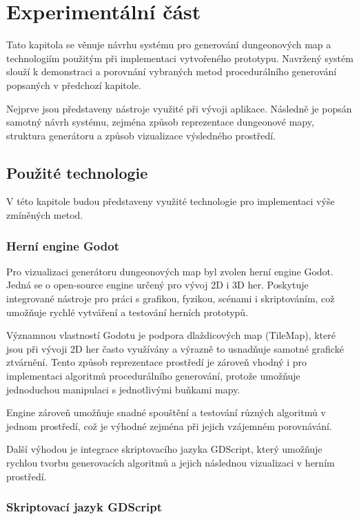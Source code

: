 \documentclass[
  program=itk,
  biblatex,
  figures=false,
  glossaries,
  index
]{kidiplom}
\begin{document}
\section{Experimentální část}

Tato kapitola se věnuje návrhu systému pro generování dungeonových map a technologiím použitým při implementaci vytvořeného prototypu. Navržený systém slouží k demonstraci a porovnání vybraných metod procedurálního generování popsaných v předchozí kapitole.

Nejprve jsou představeny nástroje využité při vývoji aplikace. Následně je popsán samotný návrh systému, zejména způsob reprezentace dungeonové mapy, struktura generátoru a způsob vizualizace výsledného prostředí.

\subsection{Použité technologie}
V této kapitole budou představeny využité technologie pro implementaci výše zmíněných metod.

\subsubsection{Herní engine Godot}

Pro vizualizaci generátoru dungeonových map byl zvolen herní engine Godot. Jedná se o open-source engine určený pro vývoj 2D i 3D her. Poskytuje integrované nástroje pro práci s grafikou, fyzikou, scénami i skriptováním, což umožňuje rychlé vytváření a testování herních prototypů.

Významnou vlastností Godotu je podpora dlaždicových map (TileMap), které jsou při vývoji 2D her často využívány a výrazně to usnadňuje samotné grafické ztvárnění. Tento způsob reprezentace prostředí je zároveň vhodný i pro implementaci algoritmů procedurálního generování, protože umožňuje jednoduchou manipulaci s jednotlivými buňkami mapy.

Engine zároveň umožňuje snadné spouštění a testování různých algoritmů v jednom prostředí, což je výhodné zejména při jejich vzájemném porovnávání.

Další výhodou je integrace skriptovacího jazyka GDScript, který umožňuje rychlou tvorbu generovacích algoritmů a jejich následnou vizualizaci v herním prostředí.

\subsubsection{Skriptovací jazyk GDScript}
\end{document}

